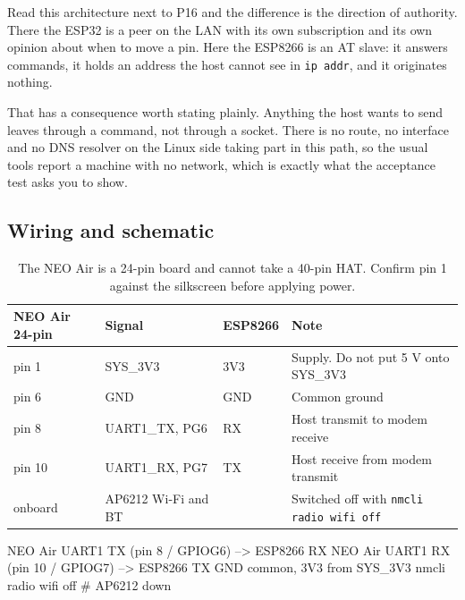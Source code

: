 Read this architecture next to P16 and the difference is the direction of authority. There the ESP32 is a peer on the LAN with its own subscription and its own opinion about when to move a pin. Here the ESP8266 is an AT slave: it answers commands, it holds an address the host cannot see in \texttt{ip addr}, and it originates nothing.

That has a consequence worth stating plainly. Anything the host wants to send leaves through a command, not through a socket. There is no route, no interface and no DNS resolver on the Linux side taking part in this path, so the usual tools report a machine with no network, which is exactly what the acceptance test asks you to show.

\subsection*{Wiring and schematic}


\begin{table}[H]\centering\small
\begin{tabular}{p{36mm}p{28mm}p{22mm}p{58mm}}
\toprule
NEO Air 24-pin & Signal & ESP8266 & Note \\
\midrule
pin 1 & SYS\_3V3 & 3V3 & Supply. Do not put 5 V onto SYS\_3V3 \\
pin 6 & GND & GND & Common ground \\
pin 8 & UART1\_TX, PG6 & RX & Host transmit to modem receive \\
pin 10 & UART1\_RX, PG7 & TX & Host receive from modem transmit \\
onboard & AP6212 Wi-Fi and BT & & Switched off with \texttt{nmcli radio wifi off} \\
\bottomrule
\end{tabular}
\caption{The NEO Air is a 24-pin board and cannot take a 40-pin HAT. Confirm pin 1 against the silkscreen before applying power.}
\end{table}

\begin{asciiart}
NEO Air UART1 TX (pin 8 / GPIOG6)  --> ESP8266 RX
NEO Air UART1 RX (pin 10 / GPIOG7) --> ESP8266 TX
GND common, 3V3 from SYS_3V3
nmcli radio wifi off            # AP6212 down
\end{asciiart}

